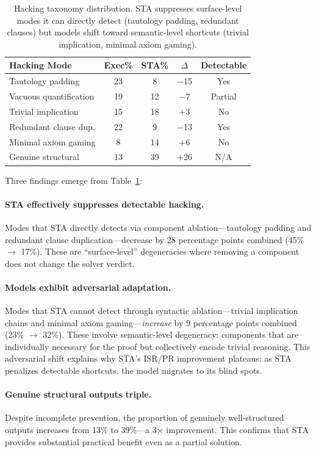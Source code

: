 \documentclass[11pt,a4paper]{article}
\begin{document}
\begin{table}[t]
\centering
\small
\caption{Hacking taxonomy distribution. STA suppresses surface-level modes it can directly detect (tautology padding, redundant clauses) but models shift toward semantic-level shortcuts (trivial implication, minimal axiom gaming).}
\label{tab:taxonomy}
\begin{tabular}{lcccc}
\toprule
Hacking Mode & Exec\% & STA\% & $\Delta$ & Detectable \\
\midrule
Tautology padding        & 23 &  8 & $-$15 & Yes \\
Vacuous quantification   & 19 & 12 & $-$7  & Partial \\
Trivial implication      & 15 & 18 & $+$3  & No \\
Redundant clause dup.    & 22 &  9 & $-$13 & Yes \\
Minimal axiom gaming     &  8 & 14 & $+$6  & No \\
Genuine structural       & 13 & 39 & $+$26 & N/A \\
\bottomrule
\end{tabular}
\end{table}

Three findings emerge from Table~\ref{tab:taxonomy}:

\paragraph{STA effectively suppresses detectable hacking.}
Modes that STA directly detects via component ablation---tautology padding and redundant clause duplication---decrease by 28 percentage points combined (45\% $\to$ 17\%).
These are ``surface-level'' degeneracies where removing a component does not change the solver verdict.

\paragraph{Models exhibit adversarial adaptation.}
Modes that STA cannot detect through syntactic ablation---trivial implication chains and minimal axiom gaming---\emph{increase} by 9 percentage points combined (23\% $\to$ 32\%).
These involve semantic-level degeneracy: components that are individually necessary for the proof but collectively encode trivial reasoning.
This adversarial shift explains why STA's ISR/PR improvement plateaus: as STA penalizes detectable shortcuts, the model migrates to its blind spots.

\paragraph{Genuine structural outputs triple.}
Despite incomplete prevention, the proportion of genuinely well-structured outputs increases from 13\% to 39\%---a 3$\times$ improvement.
This confirms that STA provides substantial practical benefit even as a partial solution.
\end{document}
